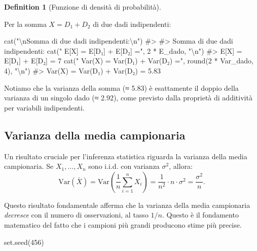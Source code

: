\documentclass[
  letterpaper,
  DIV=11,
  numbers=noendperiod,
  oneside]{scrreprt}
\newenvironment{Shaded}{\begin{snugshade}}{\end{snugshade}}
\newcommand{\CommentTok}[1]{\textcolor[rgb]{0.37,0.37,0.37}{#1}}
\newcommand{\DecValTok}[1]{\textcolor[rgb]{0.68,0.00,0.00}{#1}}
\newcommand{\FunctionTok}[1]{\textcolor[rgb]{0.28,0.35,0.67}{#1}}
\newcommand{\NormalTok}[1]{\textcolor[rgb]{0.00,0.23,0.31}{#1}}
\newcommand{\SpecialCharTok}[1]{\textcolor[rgb]{0.37,0.37,0.37}{#1}}
\newcommand{\StringTok}[1]{\textcolor[rgb]{0.13,0.47,0.30}{#1}}
\theoremstyle{definition}
\theoremstyle{plain}
\theoremstyle{definition}
\newtheorem{definition}{Definition}[chapter]
\theoremstyle{remark}
\begin{document}
\begin{definition}[Funzione di densità di
probabilità]
\begin{tcolorbox}
Per la somma \(X = D_1 + D_2\) di due dadi indipendenti:

\begin{Shaded}
\begin{Highlighting}[]
\FunctionTok{cat}\NormalTok{(}\StringTok{"}\SpecialCharTok{\textbackslash{}n}\StringTok{Somma di due dadi indipendenti:}\SpecialCharTok{\textbackslash{}n}\StringTok{"}\NormalTok{)}
\CommentTok{\#\textgreater{} }
\CommentTok{\#\textgreater{} Somma di due dadi indipendenti:}
\FunctionTok{cat}\NormalTok{(}\StringTok{"  E[X] = E[D₁] + E[D₂] ="}\NormalTok{, }\DecValTok{2} \SpecialCharTok{*}\NormalTok{ E\_dado, }\StringTok{"}\SpecialCharTok{\textbackslash{}n}\StringTok{"}\NormalTok{)}
\CommentTok{\#\textgreater{}   E[X] = E[D₁] + E[D₂] = 7}
\FunctionTok{cat}\NormalTok{(}\StringTok{"  Var(X) = Var(D₁) + Var(D₂) ="}\NormalTok{, }\FunctionTok{round}\NormalTok{(}\DecValTok{2} \SpecialCharTok{*}\NormalTok{ Var\_dado, }\DecValTok{4}\NormalTok{), }\StringTok{"}\SpecialCharTok{\textbackslash{}n}\StringTok{"}\NormalTok{)}
\CommentTok{\#\textgreater{}   Var(X) = Var(D₁) + Var(D₂) = 5.83}
\end{Highlighting}
\end{Shaded}

Notiamo che la varianza della somma (≈ 5.83) è esattamente il doppio
della varianza di un singolo dado (≈ 2.92), come previsto dalla
proprietà di additività per variabili indipendenti.

\end{tcolorbox}

\subsection{Varianza della media
campionaria}\label{varianza-della-media-campionaria}

Un risultato cruciale per l'inferenza statistica riguarda la varianza
della media campionaria. Se \(X_1, \ldots, X_n\) sono i.i.d. con
varianza \(\sigma^2\), allora: \[
\text{Var}(\bar{X}) = \text{Var}\left(\frac{1}{n}\sum_{i=1}^{n} X_i\right) = \frac{1}{n^2} \cdot n \cdot \sigma^2 = \frac{\sigma^2}{n}.
\]

Questo risultato fondamentale afferma che la varianza della media
campionaria \emph{decresce} con il numero di osservazioni, al tasso
\(1/n\). Questo è il fondamento matematico del fatto che i campioni più
grandi producono stime più precise.

\begin{Shaded}
\begin{Highlighting}[]
\FunctionTok{set.seed}\NormalTok{(}\DecValTok{456}\NormalTok{)}


\end{Highlighting}
\end{Shaded}
\end{definition}
\end{document}
